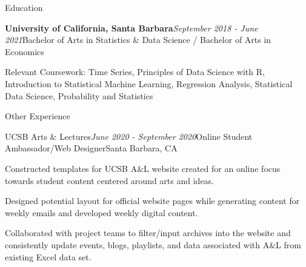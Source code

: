 \documentclass{resume} %
\begin{document}
\begin{rSection}{Education}

\begin{rSubsection}{\bf University of California, Santa Barbara}{\em September 2018 - June 2021}{Bachelor of Arts in Statistics \& Data Science / Bachelor of Arts in Economics}{}
\item Relevant Coursework: Time Series, Principles of Data Science with R, Introduction to Statistical Machine Learning, Regression Analysis, Statistical Data Science, Probability and Statistics
\end{rSubsection}

\end{rSection}


\begin{rSection}{Other Experience}

\begin{rSubsection}{UCSB Arts $\&$ Lectures}{\em June 2020 -  September 2020}{Online Student Ambassador/Web Designer}{Santa Barbara, CA}
\item Constructed templates for UCSB A$\&$L website created for an online focus towards student content centered around arts and ideas. 
\item Designed potential layout for official website pages while generating content for weekly emails and developed weekly digital content.
\item Collaborated with project teams to filter/input archives into the website and consistently update events, blogs, playlists, and data associated with A$\&$L from existing Excel data set.
\end{rSubsection}

\end{rSection}






\end{document}
